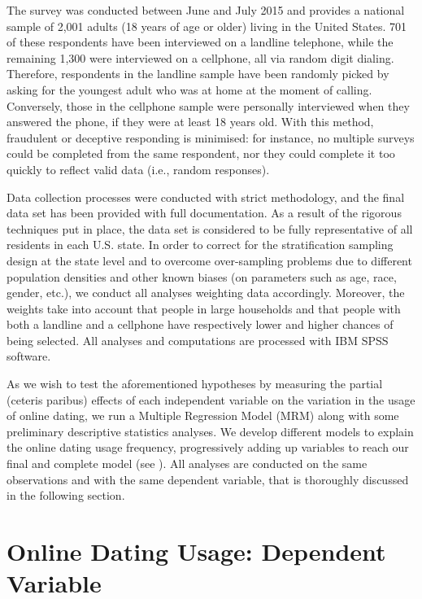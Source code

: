 The survey was conducted between June and July 2015 and provides a
national sample of 2,001 adults (18 years of age or older) living
in the United States. 701 of these respondents have been interviewed
on a landline telephone, while the remaining 1,300 were interviewed
on a cellphone, all via random digit dialing. Therefore, respondents
in the landline sample have been randomly picked by asking for the
youngest adult who was at home at the moment of calling. Conversely,
those in the cellphone sample were personally interviewed when they
answered the phone, if they were at least 18 years old. With this
method, fraudulent or deceptive responding is minimised: for instance,
no multiple surveys could be completed from the same respondent, nor
they could complete it too quickly to reflect valid data (i.e., random
responses).

Data collection processes were conducted with strict methodology,
and the final data set has been provided with full documentation.
As a result of the rigorous techniques put in place, the data set
is considered to be fully representative of all residents in each
U.S. state. In order to correct for the stratification sampling design
at the state level and to overcome over-sampling problems due to different
population densities and other known biases (on parameters such as
age, race, gender, etc.), we conduct all analyses weighting data accordingly.
Moreover, the weights take into account that people in large households
and that people with both a landline and a cellphone have respectively
lower and higher chances of being selected. All analyses and computations
are processed with IBM SPSS software. 

As we wish to test the aforementioned hypotheses by measuring the
partial (ceteris paribus) effects of each independent variable on
the variation in the usage of online dating, we run a Multiple Regression
Model (MRM) along with some preliminary descriptive statistics analyses.
We develop different models to explain the online dating usage frequency,
progressively adding up variables to reach our final and complete
model (see ). All analyses are conducted
on the same observations and with the same dependent variable, that
is thoroughly discussed in the following section.

\section{Online Dating Usage: Dependent Variable}

